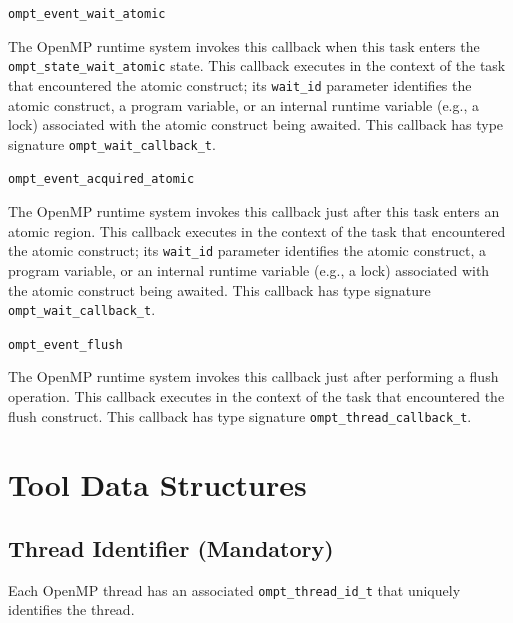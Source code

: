 \documentclass{article}
\newcommand{\descheader}[1]{{\needspace{3\baselineskip}\vspace{1em}\noindent \fbox{#1}}}
\begin{document}
\begin{description}

\item \verb|ompt_event_wait_atomic|

   The OpenMP runtime system invokes this callback when this task
   enters the \verb|ompt_state_wait_atomic| state.  This callback executes
   in the context of the task that encountered the atomic construct; its \verb|wait_id| parameter identifies
   the atomic construct, a program variable, or an internal runtime variable (e.g., a lock) associated with the atomic construct being awaited.
   This callback has type signature \verb|ompt_wait_callback_t|. 

\item \verb|ompt_event_acquired_atomic|

\sloppy
   The OpenMP runtime system invokes this callback just after this
   task enters an atomic region.  This callback executes in the
   context of the task that encountered the atomic construct; its \verb|wait_id| parameter identifies the
   atomic construct, a program variable, or an internal runtime variable (e.g., a lock) associated with the atomic construct being awaited.
   This callback has type signature \verb|ompt_wait_callback_t|. 

\end{description}

\descheader{Miscellaneous}

\begin{description}

\item \verb|ompt_event_flush|

 \sloppy
   The OpenMP runtime system invokes this callback just after
   performing a flush operation.  This callback executes in the
   context of the task that encountered the flush construct.
   This callback has type signature \verb|ompt_thread_callback_t|. 

\end{description}



\section{Tool Data Structures}
\label{sec:data}

\subsection{Thread Identifier (Mandatory)}
  Each OpenMP thread  has an associated
  \verb|ompt_thread_id_t| that uniquely identifies the thread. 
\end{document}
